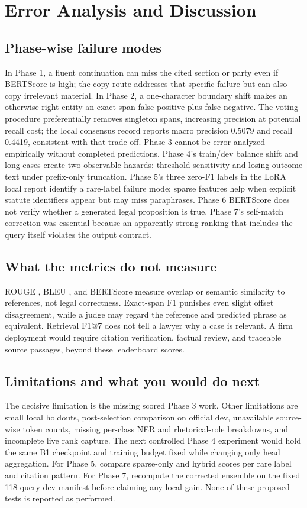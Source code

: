\documentclass[11pt,oneside]{article}
\begin{document}
\section{Error Analysis and Discussion}
\subsection{Phase-wise failure modes}
In Phase 1, a fluent continuation can miss the cited section or party even if BERTScore is high; the copy route addresses that specific failure but can also copy irrelevant material. In Phase 2, a one-character boundary shift makes an otherwise right entity an exact-span false positive plus false negative. The voting procedure preferentially removes singleton spans, increasing precision at potential recall cost; the local consensus record reports macro precision 0.5079 and recall 0.4419, consistent with that trade-off. Phase 3 cannot be error-analyzed empirically without completed predictions. Phase 4's train/dev balance shift and long cases create two observable hazards: threshold sensitivity and losing outcome text under prefix-only truncation. Phase 5's three zero-F1 labels in the LoRA local report identify a rare-label failure mode; sparse features help when explicit statute identifiers appear but may miss paraphrases. Phase 6 BERTScore does not verify whether a generated legal proposition is true. Phase 7's self-match correction was essential because an apparently strong ranking that includes the query itself violates the output contract.

\subsection{What the metrics do not measure}
ROUGE \cite{lin2004rouge}, BLEU \cite{papineni2002bleu}, and BERTScore measure overlap or semantic similarity to references, not legal correctness. Exact-span F1 punishes even slight offset disagreement, while a judge may regard the reference and predicted phrase as equivalent. Retrieval F1@7 does not tell a lawyer why a case is relevant. A firm deployment would require citation verification, factual review, and traceable source passages, beyond these leaderboard scores.

\subsection{Limitations and what you would do next}
The decisive limitation is the missing scored Phase 3 work. Other limitations are small local holdouts, post-selection comparison on official dev, unavailable source-wise token counts, missing per-class NER and rhetorical-role breakdowns, and incomplete live rank capture. The next controlled Phase 4 experiment would hold the same B1 checkpoint and training budget fixed while changing only head aggregation. For Phase 5, compare sparse-only and hybrid scores per rare label and citation pattern. For Phase 7, recompute the corrected ensemble on the fixed 118-query dev manifest before claiming any local gain. None of these proposed tests is reported as performed.
\end{document}
